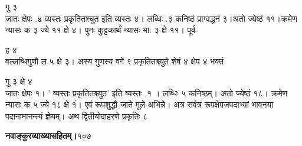 \documentclass[11pt, openany]{book}
\begin{document}
\begin{sloppypar}
\hspace{0.65in}गु ३\\

\hangindent=0.2in जातः क्षेपः .४ व्यस्तः प्रकृतितश्चुत इति व्यस्तः ४। लब्धिः .३ कनिष्ठं प्राग्वद्धनं ३।अतो ज्येष्ठं ११।क्रमेण न्यासः क ३ ज्ये ११ क्षे ४। पुनः कुट्टकार्थं न्यासः भा: ३ क्षे ११। पूर्व-

\hspace{3.75in}ह ४\\

\hangindent=0.2in वल्लब्धिगुणौ ल ५ क्षे ३। अस्य गुणस्य वर्गे ९ प्रकृतितश्च्युते शेषं ४ क्षेप ४ भक्तं

\hspace{0.8in}गु ३ क्षे ४\\

\hangindent=0.2in जातः क्षेपः १। ' व्यस्तः प्रकृतितश्च्युत' इति व्यस्तः .१ । लब्धिः ५ कनिष्ठम्। अतो ज्येष्ठं १८। क्रमेण न्यासः क ५ ज्ये १८ क्षे १ं। एवं रूपशुद्धौ जाते मूले अभिन्ने। अत्र सर्वत्र रूपक्षेपजपदाभ्यां भावनया पदानामानन्त्यं ज्ञेयम्। अथ द्वितीयोदाहरणे प्रकृतिः ८
\end{sloppypar}
\thispagestyle{empty}
\newpage

\onehalfspacing
\hspace{2in}\textbf{नवाङ्कुरव्याख्यासहितम्।}\hspace{2in}१०७

\vspace{5mm}
\end{document}
